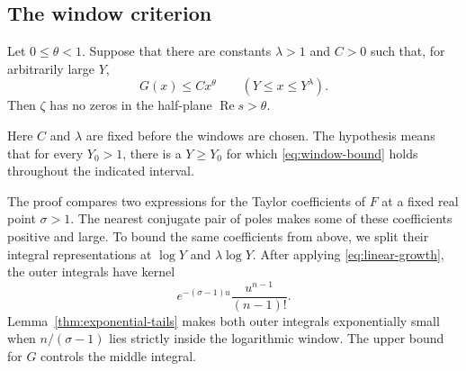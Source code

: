 \subsection{The window criterion}\label{subsec:window-criterion}

\begin{theorem}\label{thm:window-criterion}
Let $0\leq\theta<1$. Suppose that there are constants $\lambda>1$ and $C>0$ such that, for arbitrarily large $Y$,
\begin{equation}\label{eq:window-bound}
G(x)\leq Cx^\theta
\qquad(Y\leq x\leq Y^\lambda).
\end{equation}
Then $\zeta$ has no zeros in the half-plane $\operatorname{Re}s>\theta$.
\end{theorem}

Here $C$ and $\lambda$ are fixed before the windows are chosen. The hypothesis means that for every $Y_0>1$, there is a $Y\geq Y_0$ for which \eqref{eq:window-bound} holds throughout the indicated interval.

The proof compares two expressions for the Taylor coefficients of $F$ at a fixed real point $\sigma>1$. The nearest conjugate pair of poles makes some of these coefficients positive and large. To bound the same coefficients from above, we split their integral representations at $\log Y$ and $\lambda\log Y$. After applying \eqref{eq:linear-growth}, the outer integrals have kernel
\[
e^{-(\sigma-1)u}\frac{u^{n-1}}{(n-1)!}.
\]
Lemma~\ref{thm:exponential-tails} makes both outer integrals exponentially small when $n/(\sigma-1)$ lies strictly inside the logarithmic window. The upper bound for $G$ controls the middle integral.

